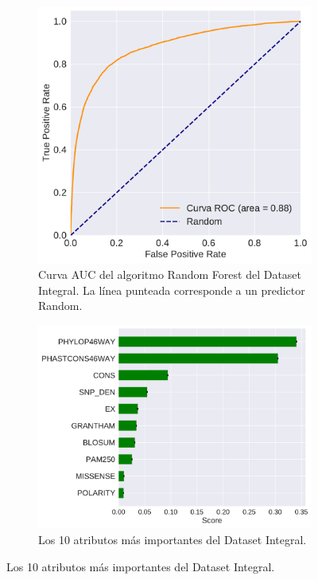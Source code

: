 
\begin{figure}[H]
\centering
\begin{subfigure}[t]{0.7\textwidth}
    \centering
    \includegraphics[width=\textwidth]{documents/latex/figures/3/integral/auc_integral.pdf}
    \caption{Curva AUC del algoritmo Random Forest del Dataset Integral. La línea punteada corresponde a un predictor Random.}
    \label{fig:auc_integral}
\end{subfigure}
\hfill
\hfill
\begin{subfigure}[b]{0.7\textwidth}
    \centering
    \includegraphics[width=\textwidth]{documents/latex/figures/3/integral/importances_integral.pdf}
    \caption{Los 10 atributos más importantes del Dataset Integral.}
    \label{fig:importances_integral}
\end{subfigure}



\end{figure}
